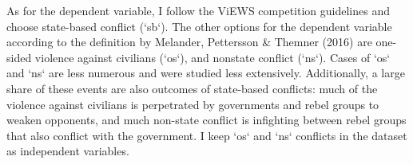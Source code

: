 \documentclass[runningheads]{llncs}
\begin{document}
    As for the dependent variable, I follow the ViEWS competition guidelines and choose state-based conflict (`sb`). The other options for the dependent variable according to the definition by Melander, Pettersson \& Themner (2016) are one-sided violence against civilians (`os`), and nonstate conflict (`ns`). Cases of `os` and `ns` are less numerous and were studied less extensively. Additionally, a large share of these events are also outcomes of state-based conflicts: much of the violence against civilians is perpetrated by governments and rebel groups to weaken opponents, and much non-state conflict is infighting between rebel groups that also conflict with the government. I keep `os` and `ns` conflicts in the dataset as independent variables.


    \begin{figure}[htbp]
        \centering


\end{figure}
\end{document}
